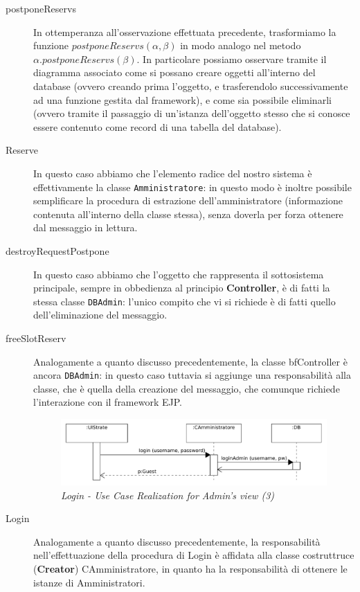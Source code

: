 \begin{description}
\item[postponeReservs]

In ottemperanza all'osservazione effettuata precedente, trasformiamo la 
funzione $postponeReservs(\alpha,\beta)$ in modo analogo nel metodo $\alpha.postponeReservs(\beta)$.
In particolare possiamo osservare tramite il diagramma associato come si possano
creare oggetti all'interno del database (ovvero creando prima l'oggetto, e 
trasferendolo successivamente ad una funzione gestita dal framework), e come
sia possibile eliminarli (ovvero tramite il passaggio di un'istanza dell'oggetto
stesso che si conosce essere contenuto come record di una tabella del database).
\bigskip

\item[Reserve]

In questo caso abbiamo che l'elemento radice del nostro sistema è effettivamente
la classe \texttt{Amministratore}: in questo modo è inoltre possibile semplificare
la procedura di estrazione dell'amministratore (informazione contenuta all'interno
della classe stessa), senza doverla per forza ottenere dal messaggio in lettura.
\bigskip



\item[destroyRequestPostpone]

In questo caso abbiamo che l'oggetto che rappresenta il sottosistema principale,
sempre in obbedienza al principio \textbf{Controller}, è di fatti la stessa classe
\texttt{DBAdmin}: l'unico compito che vi si richiede è di fatti quello dell'eliminazione
del messaggio.
\bigskip

\item[freeSlotReserv]

Analogamente a quanto discusso precedentemente, la classe bf{Controller} è ancora
\texttt{DBAdmin}: in questo caso tuttavia si aggiunge una responsabilità alla
classe, che è quella della creazione del messaggio, che comunque richiede
l'interazione con il framework EJP.

\begin{figure}[!thp]
\includegraphics[scale=0.4]{svgs2/07Login}
\caption{\textit{Login - Use Case Realization for Admin's view (3)}}
\end{figure}

\item[Login]

Analogamente a quanto discusso precedentemente, la responsabilità nell'effettuazione
della procedura di Login è affidata alla classe costruttruce (\textbf{Creator}) CAmministratore,
in quanto ha la responsabilità di ottenere le istanze di Amministratori.
 
\end{description}

